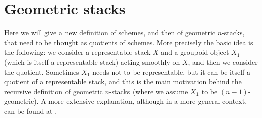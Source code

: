     \section{Geometric stacks}
        \label{section:geometric_stacks}
        Here we will give a new definition of schemes, and then of geometric $n$-stacks, that need to be thought as quotients of schemes. More precisely the basic idea is the following: we consider a representable stack $X$ and a groupoid object $X_1$ (which is itself a representable stack) acting smoothly on $X$, and then we consider the quotient. Sometimes $X_1$ needs not to be representable, but it can be itself a quotient of a representable stack, and this is the main motivation behind the recursive definition of geometric $n$-stacks (where we assume $X_1$ to be $(n-1)$-geometric). A more extensive explanation, although in a more general context, can be found at \cite[1.3.3]{ToVe:hag2}.

